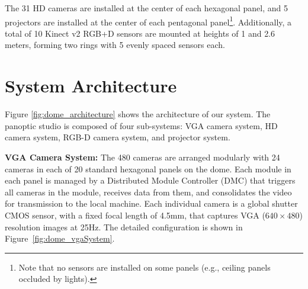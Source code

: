 The 31 HD cameras are installed at the center of each hexagonal panel, and 5 projectors are installed at the center of each pentagonal panel\footnote{Note that no sensors are installed on some panels (e.g., ceiling panels occluded by lights).}. Additionally, a total of 10 Kinect v2 RGB+D sensors are mounted at heights of 1 and 2.6 meters, forming two rings with 5 evenly spaced sensors each. %


	
\section{System Architecture}
Figure \ref{fig:dome_architecture} shows the architecture of our system. The panoptic studio is composed of four sub-systems: VGA camera system, HD camera system, RGB-D camera system, and projector system.

\noindent \textbf{VGA Camera System:} The 480 cameras are arranged modularly with 24 cameras in each of 20 standard hexagonal panels on the dome. Each module in each panel is managed by a Distributed Module Controller (DMC) that triggers all cameras in the module, receives data from them, and consolidates the video for transmission to the local machine. Each individual camera is a global shutter CMOS sensor, with a fixed focal length of 4.5mm, that captures VGA ($640\times480$) resolution images at 25Hz. The detailed configuration is shown in Figure~\ref{fig:dome_vgaSystem}. 

